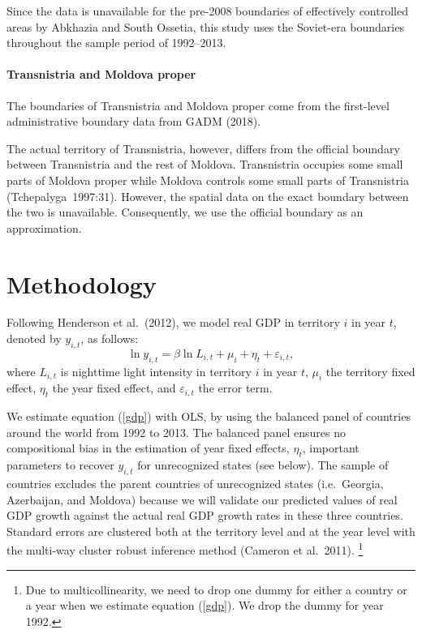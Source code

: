 \documentclass[12pt,a4paper]{article}%
\begin{document}
Since the data is unavailable for the pre-2008 boundaries of effectively controlled areas by Abkhazia and South Ossetia, this study uses the Soviet-era boundaries throughout the sample period of 1992--2013.

\paragraph{Transnistria and Moldova proper} 
The boundaries of Transnistria and Moldova proper come from the first-level administrative boundary data from GADM (2018). 

The actual territory of Transnistria, however, differs from the official boundary between Transnistria and the rest of Moldova. 
Transnistria occupies some small parts of Moldova proper while Moldova controls some small parts of Transnistria (Tchepalyga\ 1997:31). 
However, the spatial data on the exact boundary between the two is unavailable. 
Consequently, we use the official boundary as an approximation.

\section{Methodology}
Following Henderson et al.\ (2012), we model real GDP in territory $i$ in year $t$, denoted by $y_{i,t}$, as follows:
\begin{equation}\label{gdp}
\ln y_{i,t} = \beta \ln L_{i,t} + \mu_i + \eta_t + \varepsilon_{i,t},
\end{equation}
where $L_{i,t}$ is nighttime light intensity in territory $i$ in year $t$, $\mu_i$ the territory fixed effect, $\eta_t$ the year fixed effect, and $\varepsilon_{i,t}$ the error term.

We estimate equation (\ref{gdp}) with OLS, by using the balanced panel of countries around the world from 1992 to 2013. The balanced panel ensures no compositional bias in the estimation of year fixed effects, $\eta_t$, important parameters to recover $y_{i,t}$ for unrecognized states (see below). 
The sample of countries excludes the parent countries of unrecognized states (i.e.\ Georgia, Azerbaijan, and Moldova) because we will validate our predicted values of real GDP growth against the actual real GDP growth rates in these three countries.
Standard errors are clustered both at the territory level and at the year level with the multi-way cluster robust inference method (Cameron et al.\ 2011).%
\footnote{Due to multicollinearity, we need to drop one dummy for either a country or a year when we estimate equation (\ref{gdp}). We drop the dummy for year 1992.}
\end{document}
